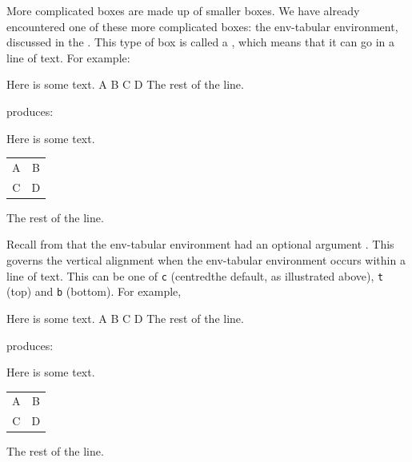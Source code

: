 More complicated boxes are made up of smaller boxes. We have already
encountered one of these more complicated boxes: the 
\gls{env-tabular} environment, discussed in the 
. This type of box is called
a , which means that it can go in a line
of text. For example:
\begin{code}\obeyspaces
Here is some text.\newline
{}\newline
A  B\newline
C  D\newline
{}\newline
The rest of the line.
\end{code}
produces:
\begin{result}
Here is some text.
\begin{tabular}{cc}
A & B\\
C & D
\end{tabular}
The rest of the line.
\end{result}
Recall from  that the 
\gls{env-tabular} environment had an optional argument
. This governs the vertical alignment when the
\gls{env-tabular} environment occurs within a line of text.
This can be one of \texttt{c} (centred\dash the default, as illustrated
above), \texttt{t} (top) and \texttt{b} (bottom). For example,
\begin{code}\obeyspaces
Here is some text.\newline
{}\newline
A  B\newline
C  D\newline
{}\newline
The rest of the line.
\end{code}%
produces:
\begin{result}
Here is some text.
\begin{tabular}[b]{cc}
A & B\\
C & D
\end{tabular}
The rest of the line.
\end{result}


